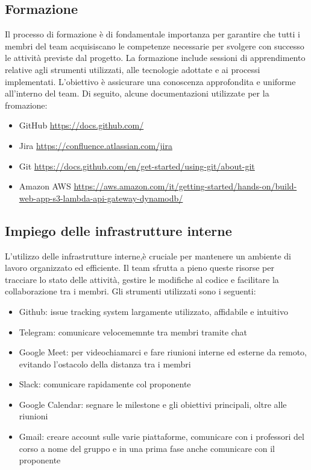 \documentclass{article}
\begin{document}
\subsection{Formazione}
Il processo di formazione è di fondamentale importanza per garantire che tutti i membri del team acquisiscano le competenze necessarie per svolgere con successo le attività previste dal progetto. La formazione include sessioni di apprendimento relative agli strumenti utilizzati, alle tecnologie adottate e ai processi implementati. L'obiettivo è assicurare una conoscenza approfondita e uniforme all'interno del team. Di seguito, alcune documentazioni utilizzate per la fromazione:
\begin{itemize}
    \item GitHub \href{https://docs.github.com/}{https://docs.github.com/}
    \item Jira \href{https://confluence.atlassian.com/jira}{https://confluence.atlassian.com/jira}
    \item Git \href{https://docs.github.com/en/get-started/using-git/about-git}{https://docs.github.com/en/get-started/using-git/about-git}
    \item Amazon AWS \href{https://aws.amazon.com/it/getting-started/hands-on/build-web-app-s3-lambda-api-gateway-dynamodb/}{https://aws.amazon.com/it/getting-started/hands-on/build-web-app-s3-lambda-api-gateway-dynamodb/}
\end{itemize}

\subsection{Impiego delle infrastrutture interne}
L'utilizzo delle infrastrutture interne,è cruciale per mantenere un ambiente di lavoro organizzato ed efficiente. Il team sfrutta a pieno queste risorse per tracciare lo stato delle attività, gestire le modifiche al codice e facilitare la collaborazione tra i membri. Gli strumenti utilizzati sono i seguenti:
\begin{itemize}
    \item Github: issue tracking system largamente utilizzato, affidabile e intuitivo
    \item Telegram: comunicare velocememnte tra membri tramite chat
    \item Google Meet: per videochiamarci e fare riunioni interne ed esterne da remoto, evitando l'ostacolo della distanza tra i membri
    \item Slack: comunicare rapidamente col proponente
    \item Google Calendar: segnare le milestone e gli obiettivi principali, oltre alle riunioni
    \item Gmail: creare account sulle varie piattaforme, comunicare con i professori del corso a nome del gruppo e in una prima fase anche comunicare con il proponente
    
\end{itemize}
\end{document}
